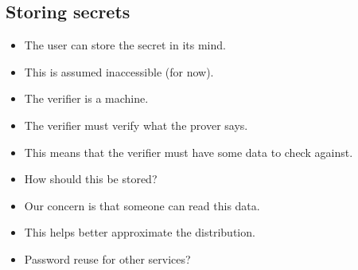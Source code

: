 \subsection{Storing secrets}

\begin{frame}
  \begin{remark}
    \begin{itemize}
      \item The user can store the secret in its mind.
      \item This is assumed inaccessible (for now).
    \end{itemize}
  \end{remark}

  \pause

  \begin{question}
    \begin{itemize}
      \item The verifier is a machine.
      \item The verifier must verify what the prover says.
      \item This means that the verifier must have some data to check against.
      \item How should this be stored?
    \end{itemize}
  \end{question}
\end{frame}

\begin{frame}
  \begin{remark}
    \begin{itemize}
      \item Our concern is that someone can read this data.
      \item This helps better approximate the distribution.
      \item Password reuse for other services?
    \end{itemize}
  \end{remark}
\end{frame}

